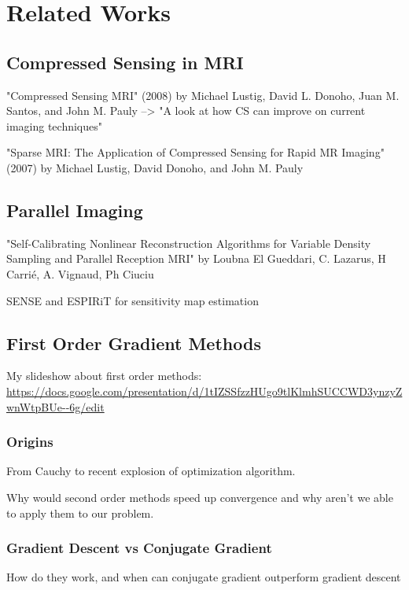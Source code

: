 \chapter{Related Works}

\section{Compressed Sensing in MRI}
"Compressed Sensing MRI" (2008) by Michael Lustig, David L. Donoho, Juan M. Santos, and John M. Pauly --> "A look at how CS can improve on current imaging techniques"

"Sparse MRI: The Application of Compressed Sensing for Rapid MR Imaging" (2007) by Michael Lustig, David Donoho, and John M. Pauly

\section{Parallel Imaging}
"Self-Calibrating Nonlinear Reconstruction Algorithms for Variable Density Sampling and Parallel Reception MRI" by Loubna El Gueddari, C. Lazarus, H Carrié, A. Vignaud, Ph Ciuciu

SENSE and ESPIRiT for sensitivity map estimation

\section{First Order Gradient Methods}

My slideshow about first order methods: \url{https://docs.google.com/presentation/d/1tIZSSfzzHUgo9tlKlmhSUCCWD3ynzyZwnWtpBUe--6g/edit}

\subsection{Origins}
From Cauchy to recent explosion of optimization algorithm.

Why would second order methods speed up convergence and why aren't we able to apply them to our problem.

\subsection{Gradient Descent vs Conjugate Gradient}
How do they work, and when can conjugate gradient outperform gradient descent

